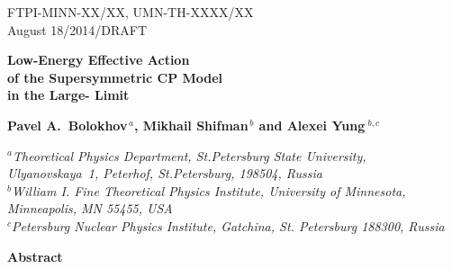 \documentclass[epsfig,12pt]{article}
\begin{document}
\begin{titlepage}


\begin{flushright}
FTPI-MINN-XX/XX, UMN-TH-XXXX/XX\\
August 18/2014/DRAFT
\end{flushright}

\vspace{1.0cm}

\begin{center}
{  \Large \bf  Low-Energy Effective Action\\[1mm]
    of the Supersymmetric CP Model\\[3mm]
    in the Large- Limit}
\end{center}



\vspace{2mm}

\begin{center}

 {\large
 \bf   Pavel A.~Bolokhov$^{\,a}$,  Mikhail Shifman$^{\,b}$ and \bf Alexei Yung$^{\,\,b,c}$}
\end {center}

\begin{center}

$^a${\it Theoretical Physics Department, St.Petersburg State University, Ulyanovskaya~1, 
	 Peterhof, St.Petersburg, 198504, Russia}\\
$^b${\it  William I. Fine Theoretical Physics Institute,
University of Minnesota,
Minneapolis, MN 55455, USA}\\
$^{c}${\it Petersburg Nuclear Physics Institute, Gatchina, St. Petersburg
188300, Russia
}
\end{center}

\vspace{0.6cm}

\begin{center}
{\large\bf Abstract}
\end{center}


\end{titlepage}
\end{document}
